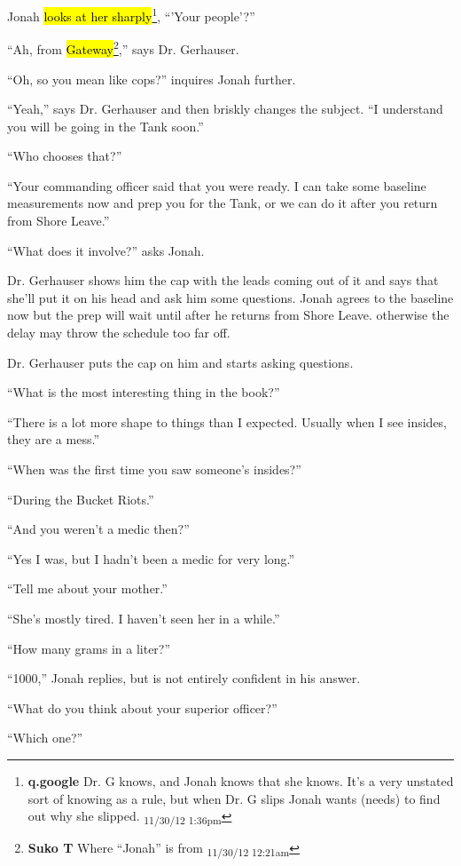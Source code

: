 Jonah \hl{looks at her sharply}\footnote{\textbf{q.google }Dr. G knows, and Jonah knows that she knows.  It's a very unstated sort of knowing as a rule, but when Dr. G slips Jonah wants (needs) to find out why she slipped. \textsubscript{11/30/12 1:36pm}}, ``'Your people'?''

``Ah, from \hl{Gateway}\footnote{\textbf{Suko T }Where ``Jonah'' is from \textsubscript{11/30/12 12:21am}},'' says Dr. Gerhauser.

``Oh, so you mean like cops?'' inquires Jonah further.

``Yeah,'' says Dr. Gerhauser and then briskly changes the subject.  ``I understand you will be going in the Tank soon.''

``Who chooses that?''

``Your commanding officer said that you were ready.  I can take some baseline measurements now and prep you for the Tank, or we can do it after you return from Shore Leave.''

``What does it involve?'' asks Jonah.

Dr. Gerhauser shows him the cap with the leads coming out of it and says that she'll put it on his head and ask him some questions.  Jonah agrees to the baseline now but the prep will wait until after he returns from Shore Leave.  otherwise the delay may throw the schedule too far off.



Dr. Gerhauser puts the cap on him and starts asking questions.

``What is the most interesting thing in the book?''

``There is a lot more shape to things than I expected.  Usually when I see insides, they are a mess.''

``When was the first time you saw someone's insides?''

``During the Bucket Riots.''

``And you weren't a medic then?''

``Yes I was, but I hadn't been a medic for very long.''

``Tell me about your mother.''

``She's mostly tired.  I haven't seen her in a while.''

``How many grams in a liter?''

``1000,'' Jonah replies, but is not entirely confident in his answer.

``What do you think about your superior officer?''

``Which one?''

